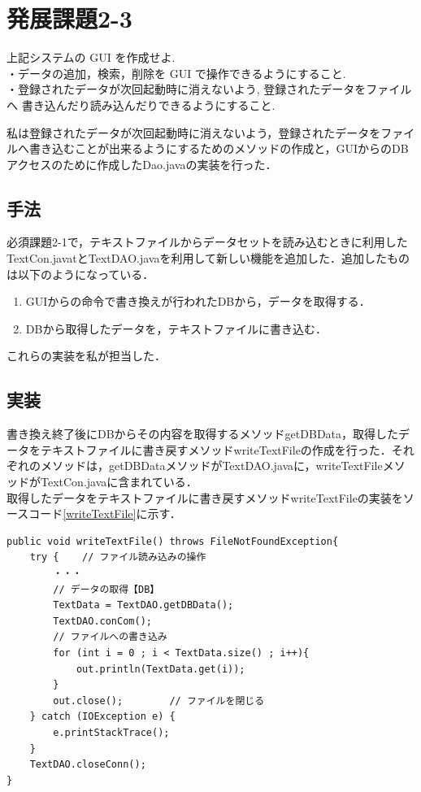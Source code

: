 \documentclass[12pt]{jarticle}
\begin{document}
\section{発展課題2-3}
\begin{screen}
  上記システムの GUI を作成せよ. \\
・データの追加，検索，削除を GUI で操作できるようにすること. \\
・登録されたデータが次回起動時に消えないよう, 登録されたデータをファイルへ 書き込んだり読み込んだりできるようにすること.
\end{screen}
私は登録されたデータが次回起動時に消えないよう，登録されたデータをファイルへ書き込むことが出来るようにするためのメソッドの作成と，GUIからのDBアクセスのために作成したDao.javaの実装を行った．

\subsection{手法}
必須課題2-1で，テキストファイルからデータセットを読み込むときに利用したTextCon.javatとTextDAO.javaを利用して新しい機能を追加した．追加したものは以下のようになっている．

\begin{enumerate}
\item GUIからの命令で書き換えが行われたDBから，データを取得する．
\item DBから取得したデータを，テキストファイルに書き込む．
\end{enumerate}
これらの実装を私が担当した．

\subsection{実装}
書き換え終了後にDBからその内容を取得するメソッドgetDBData，取得したデータをテキストファイルに書き戻すメソッドwriteTextFileの作成を行った．それぞれのメソッドは，getDBDataメソッドがTextDAO.javaに，writeTextFileメソッドがTextCon.javaに含まれている．\\

取得したデータをテキストファイルに書き戻すメソッドwriteTextFileの実装をソースコード\ref{writeTextFile}に示す．
\begin{lstlisting}[caption=writeTextFileメソッド,label=writeTextFile]
public void writeTextFile() throws FileNotFoundException{
	try {    // ファイル読み込みの操作
		・・・
		// データの取得【DB】
		TextData = TextDAO.getDBData();
		TextDAO.conCom();
		// ファイルへの書き込み
		for (int i = 0 ; i < TextData.size() ; i++){
			out.println(TextData.get(i));
		}
		out.close();        // ファイルを閉じる
	} catch (IOException e) {
		e.printStackTrace();
	}
	TextDAO.closeConn();
}
\end{lstlisting}
\end{document}
